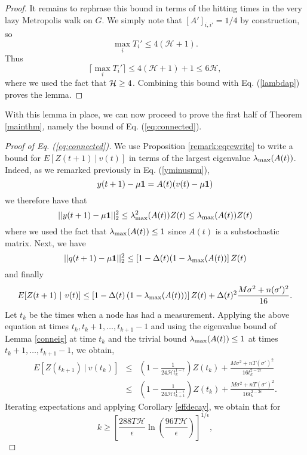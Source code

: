 \documentclass[final]{siamltex}
\begin{document}
\begin{proof}
 It remains to rephrase this bound in terms of the hitting times in 
the very lazy Metropolis walk on $G$. We simply note that $[A']_{i,i'} = 1/4$ by construction, so 
\[ \max_i T_i' \leq 4 ( \mathcal{H} + 1 ). \] Thus 
\[ \lceil \max_i T_i' \rceil \leq 4 (\mathcal{H}+1) + 1 \leq 6 \mathcal{H}, \] where we used the fact that ${\cal H} \geq 4$. Combining this bound with Eq. (\ref{lambdap}) proves the lemma. 
\end{proof} 

\smallskip

{{{With this lemma in place, we can now proceed to prove the first half of Theorem \ref{mainthm}, namely the bound of  Eq. (\ref{eq:connected}). }}}

\bigskip

\begin{proof}[Proof of Eq. (\ref{eq:connected})]  We use Proposition \ref{remark:eqrewrite} to write a bound for $E[Z(t+1) ~|~ v(t)]$ in terms of the largest eigenvalue $\lambda_{\rm max}(A(t))$. Indeed, as we remarked previously in Eq. (\ref{yminusmu}), 
\[ y(t+1) - \mu {\bf 1} = A(t) (v(t) - \mu {\bf 1} ) \] we therefore have that 
\[  ||y(t+1) - \mu {\bf 1} ||_2^2 \leq \lambda_{\rm max}^2(A(t)) Z(t) \leq \lambda_{\rm max}(A(t)) Z(t) \] where we used the fact that $\lambda_{\rm max}(A(t)) \leq 1$ since $A(t)$ is a substochastic matrix. Next, we have  
\[ ||q(t+1) - \mu {\bf 1}||_2^2 \leq \left[ 1 - \Delta(t) (1 - \lambda_{\rm max}(A(t)) \right] Z(t) \] and finally
\[ E [ Z(t+1) ~|~ v(t) ] \leq \left[ 1 - \Delta(t) \left( 1 - \lambda_{\rm max}(A(t)) \right) \right] Z(t) + \Delta(t)^2 \frac{{{{ M\sigma^2 + n(\sigma')^2}}}}{16}. \]
Let $t_k$ be the times when a node has had a measurement.  Applying the above equation at times $t_k, t_{k}+1, \dots, t_{k+1}-1$ and using the eigenvalue bound of Lemma \ref{conneig} at time $t_{k}$ and the trivial bound $\lambda_{\rm max}(A(t)) \leq 1$ at times $t_{k}+1, \ldots, t_{k+1}-1$, we obtain, 
\begin{eqnarray*} E[Z(t_{k+1}) ~|~ v(t_k)] & \leq & \left( 1 - \frac{1}{24 \mathcal{H} t_k^{1-\epsilon}} \right) Z(t_k) + \frac{ M \sigma^2 + nT (\sigma')^2 }{16 t_k^{2 - 2 \epsilon}} \\ 
& \leq & \left( 1 - \frac{1}{24 \mathcal{H}  t_{k+1}^{1-\epsilon}} \right) Z(t_k) + \frac{M \sigma^2 + nT(\sigma')^2}{16 t_k^{2 - 2 \epsilon}}.
\end{eqnarray*} Iterating expectations and applying Corollary \ref{effdecay}, we obtain that for
\begin{equation} \label{kbound} k \geq \left[ \frac{288 T  \mathcal{H} }{\epsilon} \ln \left( \frac{96 T \mathcal{H} }{\epsilon} \right) \right]^{1/\epsilon}, 

\end{equation}
\end{proof}
\end{document}
